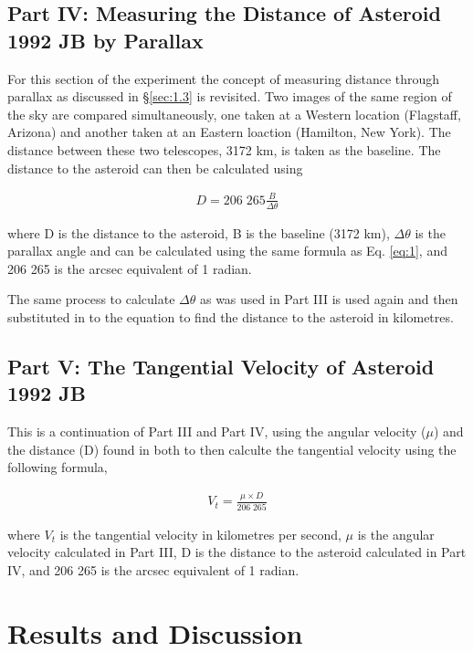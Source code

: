 \documentclass[12pt]{article}
\begin{document}
\subsection{Part IV: Measuring the Distance of Asteroid 1992 JB by Parallax}

For this section of the experiment the concept of measuring distance through parallax as discussed in §\ref{sec:1.3} is revisited. Two images of the same region of the sky are compared simultaneously, one taken at a Western location (Flagstaff, Arizona) and another taken at an
Eastern loaction (Hamilton, New York). The distance between these two telescopes, 3172 km, is taken as the baseline. The distance to the asteroid can then be calculated using

\vspace{-2ex}
\begin{gather} \label{eq:4}
    D = 206 \; 265 \frac{B}{\Delta \theta}
\end{gather}

where D is the distance to the asteroid, B is the baseline (3172 km), $\Delta \theta$ is the parallax angle and can be calculated using the same formula as Eq. \ref{eq:1}, and 206 265 is the arcsec equivalent of 1 radian.

The same process to calculate $\Delta \theta$ as was used in Part III is used again and then substituted in to the equation to find the distance to the asteroid in kilometres.

\subsection{Part V: The Tangential Velocity of Asteroid 1992 JB}

This is a continuation of Part III and Part IV, using the angular velocity ($\mu$) and the distance (D) found in both to then calculte the tangential velocity using the following formula,

\vspace{-2ex}
\begin{gather} \label{eq:5}
    V_t = \frac{\mu \times D}{206 \; 265}
\end{gather}

where $V_t$ is the tangential velocity in kilometres per second, $\mu$ is the angular velocity calculated in Part III, D is the distance to the asteroid calculated in Part IV, and 206 265 is the arcsec equivalent of 1 radian.

\newpage

\section{Results and Discussion} \label{sec:3}
\end{document}
